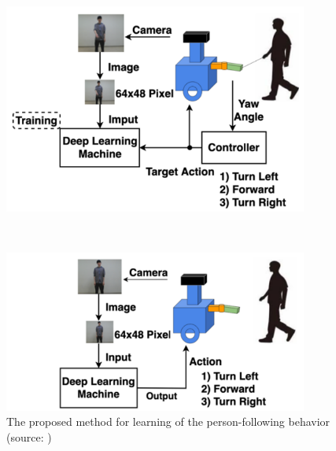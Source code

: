   \begin{figure}[h]
    \centering
    \begin{minipage}[c]{100mm} 
        \centering
        \includegraphics[width=100mm]{images/okada_learning_phase_system.png}
    \end{minipage} \\
    \vspace{1em} %
    \begin{minipage}[c]{100mm} 
        \centering
        \includegraphics[width=100mm]{images/okada_following_phase_system.png}
    \end{minipage}
    \caption[The proposed method for learning of the person-following behavior]{The proposed method for learning of the person-following behavior (source: \cite{okada})}
    \label{Fig:okada_system}
  \end{figure}

\newpage

